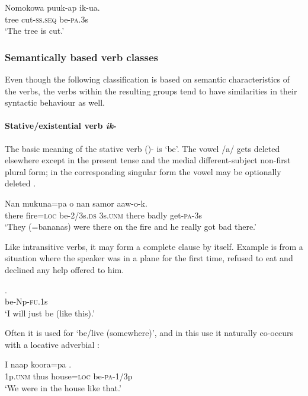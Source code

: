 \ea%
\label{ex:3:x1011}
\gll Nomokowa puuk-ap ik-ua. \\
tree cut-\textsc{ss}.\textsc{seq} be-\textsc{pa}.3s\\
\glt`The tree is cut.'
\z

\subsubsection{Semantically based verb classes} \label{sec:3.8.4.4}
{}
Even though the following classification is based on semantic characteristics of the verbs, the verbs within the resulting groups tend to have similarities in their syntactic behaviour as well.

\paragraph{Stative/existential verb \textit{ik}-} \label{sec:3.8.4.4.1}
{}
The basic meaning of the stative verb ()- is `be'. The vowel /a/ gets deleted elsewhere except in the present tense and the medial different-subject non-first plural form; in the corresponding singular form the vowel may be optionally deleted . 

\ea%
\label{ex:3:x257}
\gll Nan mukuna=pa  o nan samor aaw-o-k. \\
there fire=\textsc{loc} be-2/3s.\textsc{ds} 3s.\textsc{unm} there badly get-\textsc{pa}-3s\\
\glt`They (=bananas) were there on the fire and he really got bad there.'
\z

Like intransitive verbs, it may form a complete clause by itself. Example  is from a situation where the speaker was in a plane for the first time, refused to eat and declined any help offered to him.

\ea%
\label{ex:3:x1455}
\gll {}. \\
be-Np-\textsc{fu}.1s\\
\glt`I will just be (like this).'
\z

Often it is used for `be/live (somewhere)', and in this use it naturally co-occurs with a locative adverbial :

\ea%
\label{ex:3:x497}
\gll I naap koora=pa . \\
1p.\textsc{unm} thus house=\textsc{loc} be-\textsc{pa}-1/3p\\
\glt`We were in the house like that.'
\z

